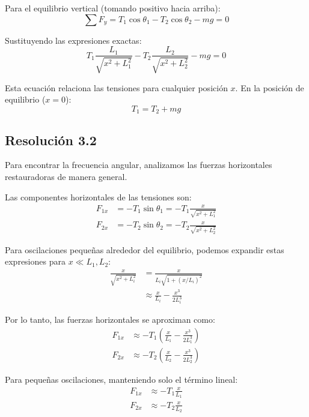 \documentclass[
  11pt,
  letterpaper,
   addpoints,
  ]{exam}
\begin{document}
\begin{questions}
\begin{solution}
Para el equilibrio vertical (tomando positivo hacia arriba):
\begin{equation}
\sum F_y = T_1\cos\theta_1 - T_2\cos\theta_2 - mg = 0
\end{equation}

Sustituyendo las expresiones exactas:
\begin{equation}
T_1 \frac{L_1}{\sqrt{x^2 + L_1^2}} - T_2 \frac{L_2}{\sqrt{x^2 + L_2^2}} - mg = 0
\end{equation}

Esta ecuación relaciona las tensiones para cualquier posición $x$. En la posición de equilibrio ($x = 0$):
\begin{equation}
\boxed{T_1 = T_2 + mg}
\end{equation}

\subsection*{Resolución 3.2}

Para encontrar la frecuencia angular, analizamos las fuerzas horizontales restauradoras de manera general.

Las componentes horizontales de las tensiones son:
\begin{align}
F_{1x} &= -T_1\sin\theta_1 = -T_1 \frac{x}{\sqrt{x^2 + L_1^2}} \\
F_{2x} &= -T_2\sin\theta_2 = -T_2 \frac{x}{\sqrt{x^2 + L_2^2}}
\end{align}

Para oscilaciones pequeñas alrededor del equilibrio, podemos expandir estas expresiones para $x \ll L_1, L_2$:
\begin{align}
\frac{x}{\sqrt{x^2 + L_i^2}} &= \frac{x}{L_i\sqrt{1 + (x/L_i)^2}} \\
&\approx \frac{x}{L_i} - \frac{x^3}{2L_i^3}
\end{align}

Por lo tanto, las fuerzas horizontales se aproximan como:
\begin{align}
F_{1x} &\approx -T_1 \left(\frac{x}{L_1} - \frac{x^3}{2L_1^3}\right) \\
F_{2x} &\approx -T_2 \left(\frac{x}{L_2} - \frac{x^3}{2L_2^3}\right)
\end{align}

Para pequeñas oscilaciones, manteniendo solo el término lineal:
\begin{align}
F_{1x} &\approx -T_1 \frac{x}{L_1} \\
F_{2x} &\approx -T_2 \frac{x}{L_2}
\end{align}


\end{solution}
\end{questions}
\end{document}
